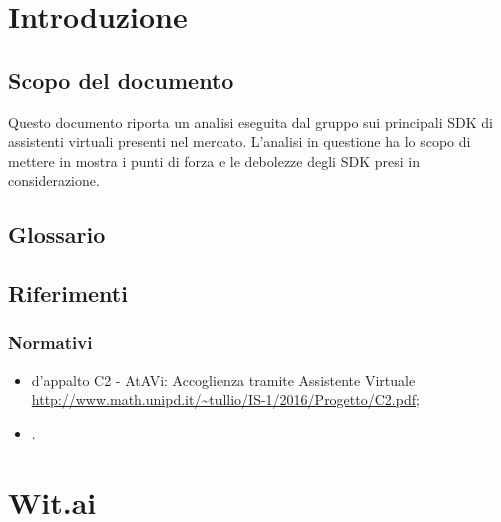 \documentclass[a4paper,titlepage]{article}
\begin{document}
\maketitle

\newpage
\tableofcontents
\newpage
\listoffigures
\newpage\texttt{}
\listoftables
\newpage
\listoftables

\section{Introduzione}
	\subsection{Scopo del documento}
Questo documento riporta un analisi eseguita dal gruppo \GRUPPO{} sui principali SDK di assistenti virtuali presenti nel mercato. L'analisi in questione ha lo scopo di mettere in mostra i punti di forza e le debolezze degli SDK presi in considerazione.
	\subsection{Glossario}
	\GLOSSARIO
	\subsection{Riferimenti}
		\subsubsection{Normativi}
\begin{itemize}
\item {} d'appalto C2 - AtAVi: Accoglienza tramite Assistente Virtuale \\	\url{http://www.math.unipd.it/~tullio/IS-1/2016/Progetto/C2.pdf};
\item \NPdoc.
\end{itemize}
\section{Wit.ai}
\end{document}
